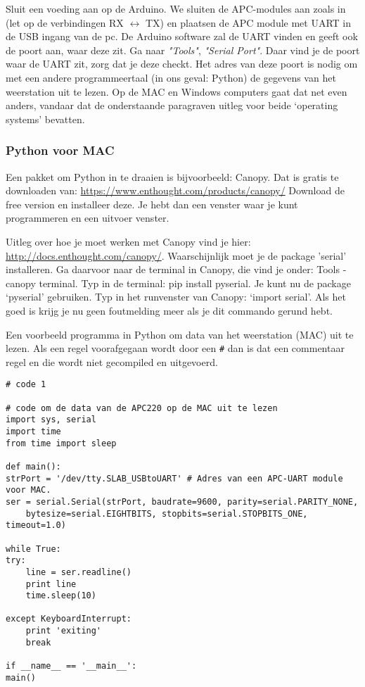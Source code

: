 Sluit een voeding aan op de Arduino.
We sluiten de APC-modules aan zoals in  (let op de
verbindingen RX $\longleftrightarrow$ TX) en plaatsen de APC module met UART
in de USB ingang van de pc. De Arduino software zal de UART vinden en
geeft ook de poort aan, waar deze zit. Ga naar \emph {"Tools"},
\emph{"Serial Port"}. Daar vind je de poort waar de UART zit, zorg dat je deze checkt.
Het adres van deze poort is nodig om met een andere programmeertaal (in ons
geval: Python) de gegevens van het weerstation uit te lezen. 
Op de MAC en Windows computers gaat dat net even anders, vandaar dat de onderstaande
paragraven uitleg voor beide `operating systems' bevatten.

\subsubsection{Python voor MAC}
Een pakket om Python in te draaien is bijvoorbeeld: Canopy.
Dat is gratis te downloaden van: \url{https://www.enthought.com/products/canopy/}
Download de free version en installeer deze. Je hebt dan een venster waar je kunt
programmeren en een uitvoer venster. 

Uitleg over hoe je moet werken met Canopy vind je hier:
\url{http://docs.enthought.com/canopy/}. Waarschijnlijk moet je de package 'serial'
installeren. Ga daarvoor naar de terminal in Canopy, die vind je onder:
Tools - canopy terminal. Typ in de terminal: pip install pyserial. Je kunt nu de
package `pyserial' gebruiken. Typ in het runvenster van Canopy: `import serial'. Als het goed is 
krijg je nu geen foutmelding meer als je dit commando gerund hebt.

Een voorbeeld programma in Python om data van het weerstation (MAC) uit te lezen.
Als een regel voorafgegaan wordt door een \verb|#| dan is dat een commentaar 
regel en die wordt niet gecompiled en uitgevoerd.

\begin{verbatim}
# code 1

# code om de data van de APC220 op de MAC uit te lezen
import sys, serial
import time
from time import sleep
      
def main():
strPort = '/dev/tty.SLAB_USBtoUART' # Adres van een APC-UART module voor MAC. 
ser = serial.Serial(strPort, baudrate=9600, parity=serial.PARITY_NONE, 
    bytesize=serial.EIGHTBITS, stopbits=serial.STOPBITS_ONE, timeout=1.0)
    
while True:
try:
    line = ser.readline()
    print line
    time.sleep(10)
 
except KeyboardInterrupt:
    print 'exiting'
    break
    
if __name__ == '__main__':
main()
    
\end{verbatim}

